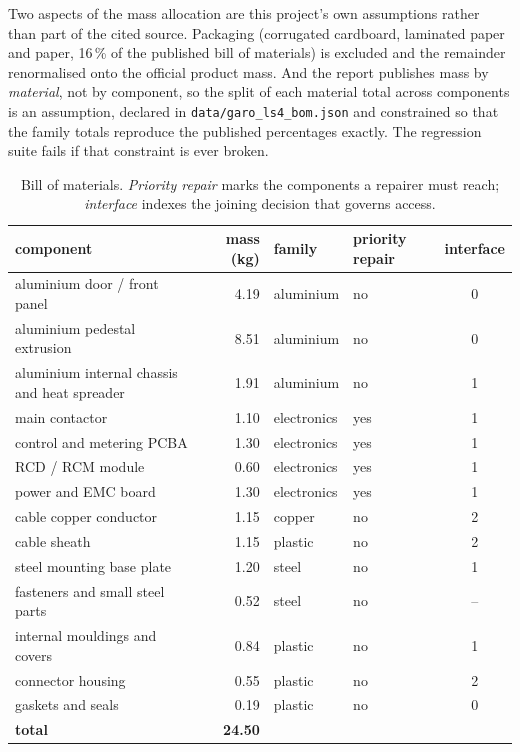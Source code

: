 \documentclass[11pt,a4paper]{article}
\begin{document}
Two aspects of the mass allocation are this project's own assumptions rather
than part of the cited source. Packaging (corrugated cardboard,
laminated paper and paper, 16\,\% of the published bill of materials)
is excluded and the remainder renormalised onto the official product mass.
And the report publishes mass by \emph{material}, not by component, so the
split of each material total across components is an assumption, declared
in \texttt{data/garo\_ls4\_bom.json} and constrained so that the family
totals reproduce the published percentages exactly. The regression suite
fails if that constraint is ever broken.

\begin{table}[h]
\centering\small
\caption{Bill of materials. \emph{Priority repair} marks the components a
repairer must reach; \emph{interface} indexes the joining decision that governs
access.}
\begin{tabular}{lrllc}
\toprule
component & mass (kg) & family & priority repair & interface \\
\midrule
aluminium door / front panel & 4.19 & aluminium & no & 0 \\
aluminium pedestal extrusion & 8.51 & aluminium & no & 0 \\
aluminium internal chassis and heat spreader & 1.91 & aluminium & no & 1 \\
main contactor & 1.10 & electronics & yes & 1 \\
control and metering PCBA & 1.30 & electronics & yes & 1 \\
RCD / RCM module & 0.60 & electronics & yes & 1 \\
power and EMC board & 1.30 & electronics & yes & 1 \\
cable copper conductor & 1.15 & copper & no & 2 \\
cable sheath & 1.15 & plastic & no & 2 \\
steel mounting base plate & 1.20 & steel & no & 1 \\
fasteners and small steel parts & 0.52 & steel & no & -- \\
internal mouldings and covers & 0.84 & plastic & no & 1 \\
connector housing & 0.55 & plastic & no & 2 \\
gaskets and seals & 0.19 & plastic & no & 0 \\
\midrule
\textbf{total} & \textbf{24.50} & & & \\
\bottomrule
\end{tabular}
\end{table}
\end{document}
